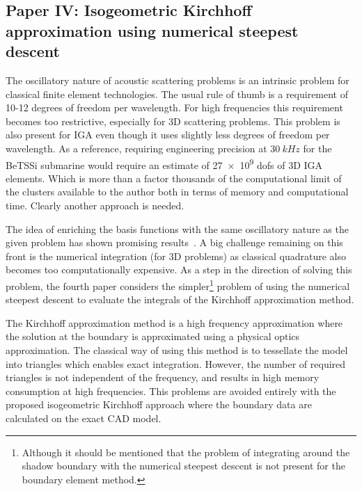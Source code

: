 \subsection{Paper IV: Isogeometric Kirchhoff approximation using numerical steepest descent}
The oscillatory nature of acoustic scattering problems is an intrinsic problem for classical finite element technologies. The usual rule of thumb is a requirement of 10-12 degrees of freedom per wavelength. For high frequencies this requirement becomes too restrictive, especially for 3D scattering problems. This problem is also present for IGA even though it uses slightly less degrees of freedom per wavelength. As a reference, requiring engineering precision at $\SI{30}{kHz}$ for the BeTSSi submarine would require an estimate of \num{27e9} dofs of 3D IGA elements. Which is more than a factor thousands of the computational limit of the clusters available to the author both in terms of memory and computational time. Clearly another approach is needed. 

The idea of enriching the basis functions with the same oscillatory nature as the given problem has shown promising results~\cite{Chandler_Wilde2012nab,Peake2013eib, Peake2014eai,Peake2015eib}. A big challenge remaining on this front is the numerical integration (for 3D problems) as classical quadrature also becomes too computationally expensive. As a step in the direction of solving this problem, the fourth paper considers the simpler\footnote{Although it should be mentioned that the problem of integrating around the shadow boundary with the numerical steepest descent is not present for the boundary element method.} problem of using the numerical steepest descent to evaluate the integrals of the Kirchhoff approximation method. 

The Kirchhoff approximation method is a high frequency approximation where the solution at the boundary is approximated using a physical optics approximation. The classical way of using this method is to tessellate the model into triangles which enables exact integration. However, the number of required triangles is not independent of the frequency, and results in high memory consumption at high frequencies. This problems are avoided entirely with the proposed isogeometric Kirchhoff approach where the boundary data are calculated on the exact CAD model.